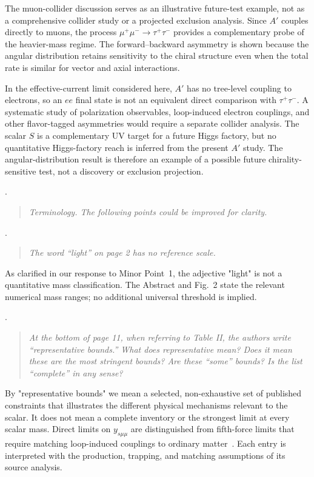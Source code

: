 \documentclass[12pt,a4paper]{article}
\begin{document}
The muon-collider discussion serves as an illustrative future-test example, not as a comprehensive collider study or a projected exclusion analysis. Since \(A'\) couples directly to muons, the process \(\mu^+\mu^-\to\tau^+\tau^-\) provides a complementary probe of the heavier-mass regime. The forward--backward asymmetry is shown because the angular distribution retains sensitivity to the chiral structure even when the total rate is similar for vector and axial interactions.

In the effective-current limit considered here, \(A'\) has no tree-level coupling to electrons, so an \(ee\) final state is not an equivalent direct comparison with \(\tau^+\tau^-\). A systematic study of polarization observables, loop-induced electron couplings, and other flavor-tagged asymmetries would require a separate collider analysis. The scalar \(S\) is a complementary UV target for a future Higgs factory, but no quantitative Higgs-factory reach is inferred from the present \(A'\) study. The angular-distribution result is therefore an example of a possible future chirality-sensitive test, not a discovery or exclusion projection.

\medskip
{}. \begin{quote}\itshape
Terminology. The following points could be improved for clarity.
\end{quote}

\medskip
{}. \begin{quote}\itshape
The word ``light'' on page 2 has no reference scale.
\end{quote}

As clarified in our response to Minor Point~1, the adjective "light" is not a quantitative mass classification. The Abstract and Fig.~2 state the relevant numerical mass ranges; no additional universal threshold is implied.

\medskip
{}. \begin{quote}\itshape
At the bottom of page 11, when referring to Table II, the authors write ``representative bounds.'' What does representative mean? Does it mean these are the most stringent bounds? Are these ``some'' bounds? Is the list ``complete'' in any sense?
\end{quote}

By "representative bounds" we mean a selected, non-exhaustive set of published constraints that illustrates the different physical mechanisms relevant to the scalar. It does not mean a complete inventory or the strongest limit at every scalar mass. Direct limits on \(y_{s\mu\mu}\) are distinguished from fifth-force limits that require matching loop-induced couplings to ordinary matter~\cite{Liu:2025zuz,Fiorillo:2026wso,Caputo:2021rux,Hoskins:1985tn,Kapner:2006si,Blakemore:2021zna}. Each entry is interpreted with the production, trapping, and matching assumptions of its source analysis.
\end{document}

